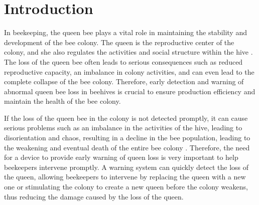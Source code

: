 \section{Introduction}
In beekeeping, the queen bee plays a vital role in maintaining the stability and development
of the bee colony. The queen is the reproductive center of the colony, and she also regulates
the activities and social structure within the hive \cite{anton2022introduction}. The loss of the queen bee
often leads to serious consequences such as reduced reproductive capacity, an imbalance in
colony activities, and can even lead to the complete collapse of the bee colony. Therefore,
early detection and warning of abnormal queen bee loss in beehives is crucial to ensure
production efficiency and maintain the health of the bee colony.

If the loss of the queen bee in the colony is not detected promptly, it can cause serious
problems such as an imbalance in the activities of the hive, leading to disorientation and
chaos, resulting in a decline in the bee population, leading to the weakening and eventual
death of the entire bee colony \cite{honey_bee_colony_2021}. Therefore, the need for a device to provide early
warning of queen loss is very important to help beekeepers intervene promptly. A warning
system can quickly detect the loss of the queen, allowing beekeepers to intervene by
replacing the queen with a new one or stimulating the colony to create a new queen before
the colony weakens, thus reducing the damage caused by the loss of the queen.
